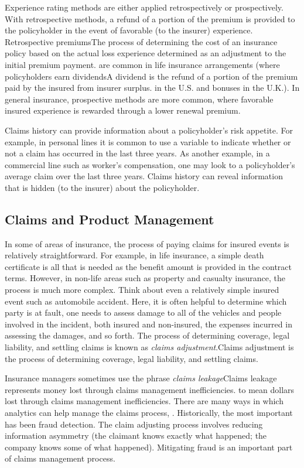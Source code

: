 \documentclass[]{book}
\theoremstyle{definition}
\theoremstyle{definition}
\theoremstyle{definition}
\theoremstyle{remark}
\begin{document}
Experience rating methods are either applied retrospectively or
prospectively. With retrospective methods, a refund of a portion of the
premium is provided to the policyholder in the event of favorable (to
the insurer) experience. Retrospective premiums{The process of
determining the cost of an insurance policy based on the actual loss
experience determined as an adjustment to the initial premium payment.}
are common in life insurance arrangements (where policyholders earn
dividends{A dividend is the refund of a portion of the premium paid by
the insured from insurer surplus.} in the U.S. and bonuses in the U.K.).
In general insurance, prospective methods are more common, where
favorable insured experience is rewarded through a lower renewal
premium.

Claims history can provide information about a policyholder's risk
appetite. For example, in personal lines it is common to use a variable
to indicate whether or not a claim has occurred in the last three years.
As another example, in a commercial line such as worker's compensation,
one may look to a policyholder's average claim over the last three
years. Claims history can reveal information that is hidden (to the
insurer) about the policyholder.

\subsection{Claims and Product
Management}\label{claims-and-product-management}

In some of areas of insurance, the process of paying claims for insured
events is relatively straightforward. For example, in life insurance, a
simple death certificate is all that is needed as the benefit amount is
provided in the contract terms. However, in non-life areas such as
property and casualty insurance, the process is much more complex. Think
about even a relatively simple insured event such as automobile
accident. Here, it is often helpful to determine which party is at
fault, one needs to assess damage to all of the vehicles and people
involved in the incident, both insured and non-insured, the expenses
incurred in assessing the damages, and so forth. The process of
determining coverage, legal liability, and settling claims is known as
\emph{claims adjustment}.{Claims adjustment is the process of
determining coverage, legal liability, and settling claims.}

Insurance managers sometimes use the phrase \emph{claims leakage}{Claims
leakage represents money lost through claims management inefficiencies.}
to mean dollars lost through claims management inefficiencies. There are
many ways in which analytics can help manage the claims process,
\citet{SASsurvey}. Historically, the most important has been fraud
detection. The claim adjusting process involves reducing information
asymmetry (the claimant knows exactly what happened; the company knows
some of what happened). Mitigating fraud is an important part of claims
management process.
\end{document}

